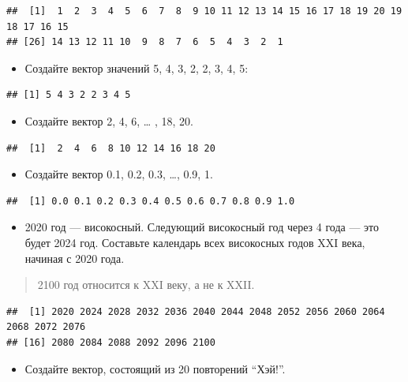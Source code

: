 \documentclass[]{book}
\providecommand{\tightlist}{%
  \setlength{\itemsep}{0pt}\setlength{\parskip}{0pt}}
\begin{document}
\begin{verbatim}
##  [1]  1  2  3  4  5  6  7  8  9 10 11 12 13 14 15 16 17 18 19 20 19 18 17 16 15
## [26] 14 13 12 11 10  9  8  7  6  5  4  3  2  1
\end{verbatim}

\begin{itemize}
\tightlist
\item
  Создайте вектор значений 5, 4, 3, 2, 2, 3, 4, 5:
\end{itemize}

\begin{verbatim}
## [1] 5 4 3 2 2 3 4 5
\end{verbatim}

\begin{itemize}
\tightlist
\item
  Создайте вектор 2, 4, 6, \ldots{} , 18, 20.
\end{itemize}

\begin{verbatim}
##  [1]  2  4  6  8 10 12 14 16 18 20
\end{verbatim}

\begin{itemize}
\tightlist
\item
  Создайте вектор 0.1, 0.2, 0.3, \ldots{}, 0.9, 1.
\end{itemize}

\begin{verbatim}
##  [1] 0.0 0.1 0.2 0.3 0.4 0.5 0.6 0.7 0.8 0.9 1.0
\end{verbatim}

\begin{itemize}
\tightlist
\item
  2020 год --- високосный. Следующий високосный год через 4 года --- это
  будет 2024 год. Составьте календарь всех високосных годов XXI века,
  начиная с 2020 года.
\end{itemize}

\begin{quote}
2100 год относится к XXI веку, а не к XXII.
\end{quote}

\begin{verbatim}
##  [1] 2020 2024 2028 2032 2036 2040 2044 2048 2052 2056 2060 2064 2068 2072 2076
## [16] 2080 2084 2088 2092 2096 2100
\end{verbatim}

\begin{itemize}
\tightlist
\item
  Создайте вектор, состоящий из 20 повторений ``Хэй!''.
\end{itemize}
\end{document}

